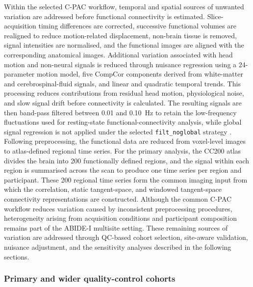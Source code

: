 Within the selected C-PAC workflow, temporal and spatial sources of unwanted variation are addressed before functional connectivity is estimated. Slice-acquisition timing differences are corrected, successive functional volumes are realigned to reduce motion-related displacement, non-brain tissue is removed, signal intensities are normalised, and the functional images are aligned with the corresponding anatomical images. Additional variation associated with head motion and non-neural signals is reduced through nuisance regression using a 24-parameter motion model, five CompCor components derived from white-matter and cerebrospinal-fluid signals, and linear and quadratic temporal trends. This processing reduces contributions from residual head motion, physiological noise, and slow signal drift before connectivity is calculated. The resulting signals are then band-pass filtered between 0.01 and 0.10~Hz to retain the low-frequency fluctuations used for resting-state functional-connectivity analysis, while global signal regression is not applied under the selected \texttt{filt\_noglobal} strategy \citep{Craddocketal2013}. Following preprocessing, the functional data are reduced from voxel-level images to atlas-defined regional time series. For the primary analysis, the CC200 atlas divides the brain into 200 functionally defined regions, and the signal within each region is summarised across the scan to produce one time series per region and participant. These 200 regional time series form the common imaging input from which the correlation, static tangent-space, and windowed tangent-space connectivity representations are constructed. Although the common C-PAC workflow reduces variation caused by inconsistent preprocessing procedures, heterogeneity arising from acquisition conditions and participant composition remains part of the ABIDE-I multisite setting. These remaining sources of variation are addressed through QC-based cohort selection, site-aware validation, nuisance adjustment, and the sensitivity analyses described in the following sections.

\subsubsection{Primary and wider quality-control cohorts}
\label{subsubsec:cohorts}

